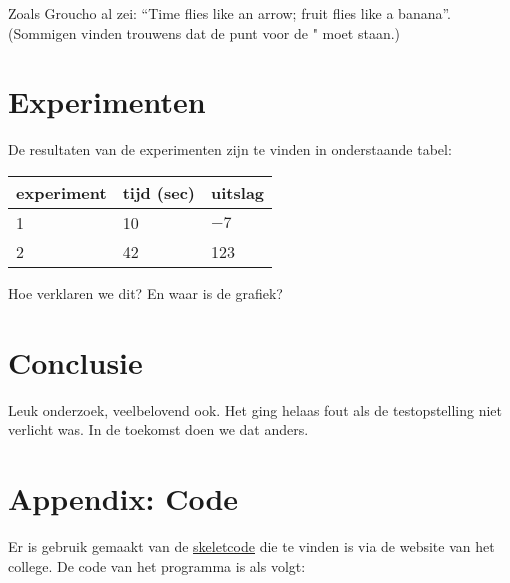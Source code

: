 \documentclass[10pt]{article}
\begin{document}
\bigskip


\noindent
Zoals Groucho al zei:
``Time flies like an arrow; fruit flies like a banana''. (Sommigen vinden trouwens dat de punt voor de " moet staan.)

\section{Experimenten}

De resultaten van de experimenten zijn te
vinden in onderstaande tabel:

\begin{center}
\begin{tabular}{l|l|l}
experiment & tijd (sec) & uitslag\\
\hline
1 & 10 & $-7$\\
2 & 42 & 123
\end{tabular}
\end{center}
Hoe verklaren we dit? En waar is de grafiek?

\section{Conclusie}

Leuk onderzoek, veelbelovend ook. Het ging helaas
fout als de testopstelling niet verlicht was.
In de toekomst doen we dat anders.




\section*{Appendix: Code}

Er is gebruik gemaakt van de \href{http://www.liacs.leidenuniv.nl/~kosterswa/AI/iets.cc}{\underline{skeletcode}} die te vinden is via
de website van het college.
De code van het programma is als volgt:

\smallskip


\end{document}
